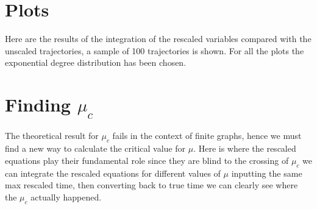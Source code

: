 \section{Plots}

Here are the results of the integration of the rescaled variables compared with the unscaled trajectories, a sample of 100 trajectories is shown. For all the plots the exponential degree distribution has been chosen.

%
%

\section{Finding $\mu_c$}

The theoretical result for $\mu_c$ fails in the context of finite graphs, hence we must find a new way to calculate the critical value for $\mu$. Here is where the rescaled equations play their fundamental role since they are blind to the crossing of $\mu_c$ we can integrate the rescaled equations for different values of $\mu$ inputting the same max rescaled time, then converting back to true time we can clearly see where the $\mu_c$ actually happened.


